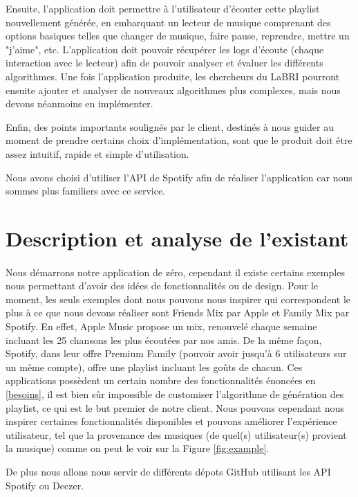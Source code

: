 \documentclass{article}
\begin{document}
		Ensuite, l'application doit permettre à l'utilisateur d'écouter cette playlist nouvellement générée, en embarquant un lecteur de musique comprenant des options basiques telles que changer de musique, faire pause, reprendre, mettre un "j'aime", etc. L'application doit pouvoir récupérer les logs d'écoute (chaque interaction avec le lecteur) afin de pouvoir analyser et évaluer les différents algorithmes. Une fois l'application produite, les chercheurs du LaBRI pourront ensuite ajouter et analyser de nouveaux algorithmes plus complexes, mais nous devons néanmoins en implémenter. 
		    
		Enfin, des points importants soulignés par le client, destinés à nous guider au moment de prendre certains choix d'implémentation, sont que le produit doit être assez intuitif, rapide et simple d'utilisation. 
		
		Nous avons choisi d'utiliser l'API de Spotify afin de réaliser l'application car nous sommes plus familiers avec ce service.     
		\section{Description et analyse de l'existant}
		\paragraph{}
		Nous démarrons notre application de zéro, cependant il existe certains exemples nous permettant d'avoir des idées de fonctionnalités ou de design. Pour le moment, les seuls exemples dont nous pouvons nous inspirer qui correspondent le plus à ce que nous devons réaliser sont Friends Mix par Apple et Family Mix par Spotify. En effet, Apple Music propose un mix, renouvelé chaque semaine incluant les 25 chansons les plus écoutées par nos amis. De la même façon, Spotify, dans leur offre Premium Family (pouvoir avoir jusqu'à 6 utilisateurs sur un même compte), offre une playlist incluant les goûts de chacun. Ces applications possèdent un certain nombre des fonctionnalités énoncées en \ref{besoins}, il est bien sûr impossible de customiser l'algorithme de génération des playlist, ce qui est le but premier de notre client. Nous pouvons cependant nous inspirer certaines fonctionnalités disponibles et pouvons améliorer l'expérience utilisateur, tel que la provenance des musiques (de quel(s) utilisateur(s) provient la musique) comme on peut le voir sur la Figure \ref{fig:example}.
		
		
		De plus nous allons nous servir de différents dépots GitHub utilisant les API Spotify \cite{spotify-web-api} ou Deezer.
		
\end{document}
